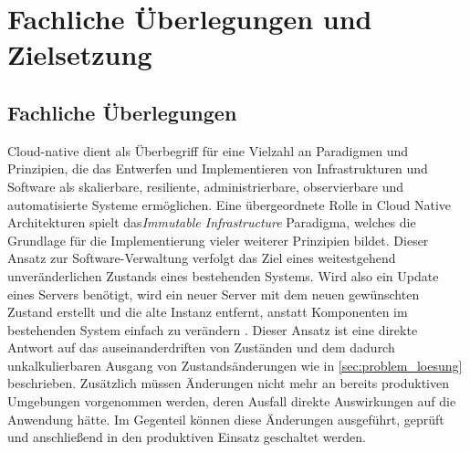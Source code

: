 \documentclass[11pt]{scrartcl}
\begin{document}
\section{\label{sec:fachliche_ueberlegungen} Fachliche Überlegungen und Zielsetzung}
\subsection{Fachliche Überlegungen}
Cloud-native dient als Überbegriff für eine Vielzahl an Paradigmen und Prinzipien, die das Entwerfen und Implementieren von Infrastrukturen und Software als skalierbare, resiliente, administrierbare, observierbare und automatisierte Systeme ermöglichen. Eine übergeordnete Rolle in Cloud Native Architekturen spielt das\textit{Immutable Infrastructure} Paradigma, welches die Grundlage für die Implementierung vieler weiterer Prinzipien bildet. Dieser Ansatz zur Software-Verwaltung verfolgt das Ziel eines weitestgehend unveränderlichen Zustands eines bestehenden Systems. Wird also ein Update eines Servers benötigt, wird ein neuer Server mit dem neuen gewünschten Zustand erstellt und die alte Instanz entfernt, anstatt Komponenten im bestehenden System einfach zu verändern \citep{Hirschfeld:2018}. 
Dieser Ansatz ist eine direkte Antwort auf das auseinanderdriften von Zuständen und dem dadurch unkalkulierbaren Ausgang von Zustandsänderungen wie in \cref{sec:problem_loesung} beschrieben. Zusätzlich müssen Änderungen nicht mehr an bereits produktiven Umgebungen vorgenommen werden, deren Ausfall direkte Auswirkungen auf die Anwendung hätte. Im Gegenteil können diese Änderungen ausgeführt, geprüft und anschließend in den produktiven Einsatz geschaltet werden.
\end{document}
